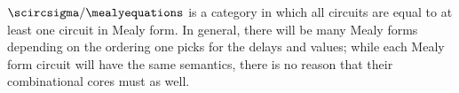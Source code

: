 \(\scircsigma / \mealyequations\) is a category in which all circuits are equal
to at least one circuit in Mealy form.
In general, there will be many Mealy forms depending on the ordering one picks
for the delays and values; while each Mealy form circuit will have the same
semantics, there is no reason that their combinational cores must as well.